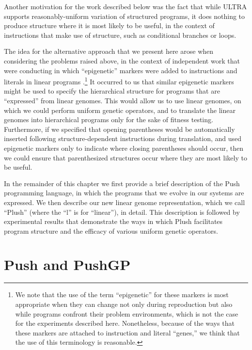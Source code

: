 Another motivation for the work described below was the fact that while ULTRA supports reasonably-uniform variation of structured programs, it does nothing to produce structure where it is most likely to be useful, in the context of instructions that make use of structure, such as conditional branches or loops.

The idea for the alternative approach that we present here arose when considering the problems raised above, in the context of independent work that were conducting in which ``epigenetic'' markers were added to instructions and literals in linear programs \citep{LaCava:2014:GPTP,LaCava:2014:GECCOcomp,LaCava:2015:GECCO}.\footnote{We note that the use of the term ``epigenetic'' for these markers is most appropriate when they can change not only during reproduction but also while programs confront their problem environments, which is not the case for the experiments described here. Nonetheless, because of the ways that these markers are attached to instruction and literal ``genes,'' we think that the use of this terminology is reasonable.} It occurred to us that similar epigenetic markers might be used to specify the hierarchical structure for programs that are ``expressed'' from linear genomes. This would allow us to use linear genomes, on which we could perform uniform genetic operators, and to translate the linear genomes into hierarchical programs only for the sake of fitness testing. Furthermore, if we specified that opening parentheses would be automatically inserted following structure-dependent instructions during translation, and used epigenetic markers only to indicate where closing parentheses should occur, then we could ensure that parenthesized structures occur where they are most likely to be useful.

In the remainder of this chapter we first provide a brief description of the Push programming language, in which the programs that we evolve in our systems are expressed. We then describe our new linear genome representation, which we call ``Plush'' (where the ``l'' is for ``linear''), in detail. This description is followed by experimental results that demonstrate the ways in which Plush facilitates program structure and the efficacy of various uniform genetic operators.




\section{Push and PushGP}

